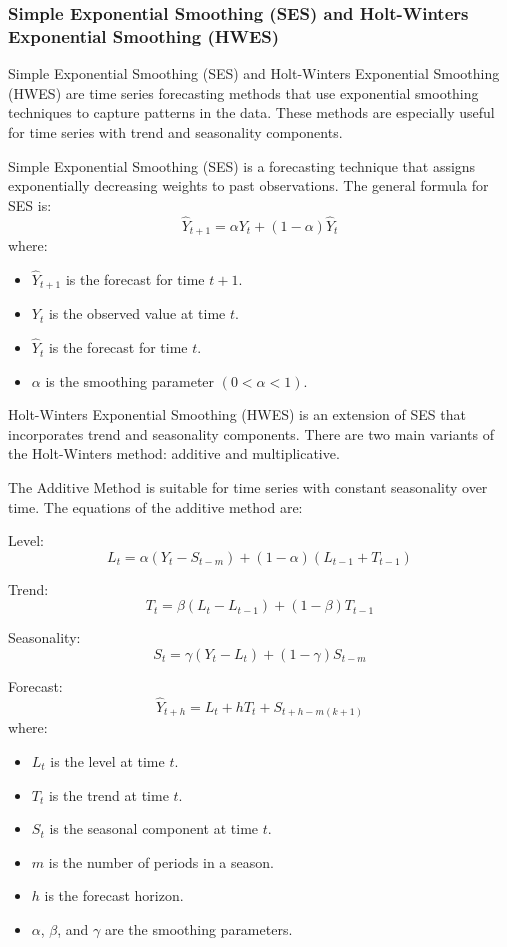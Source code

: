 \subsubsection{Simple Exponential Smoothing (SES) and Holt-Winters Exponential Smoothing (HWES)}

Simple Exponential Smoothing (SES) and Holt-Winters Exponential Smoothing (HWES) are time series forecasting methods that use exponential smoothing techniques to capture patterns in the data. These methods are especially useful for time series with trend and seasonality components.

Simple Exponential Smoothing (SES) is a forecasting technique that assigns exponentially decreasing weights to past observations. The general formula for SES is:
\[
\hat{Y}_{t+1} = \alpha Y_t + (1-\alpha) \hat{Y}_t
\]
where:
\begin{itemize}
    \item \( \hat{Y}_{t+1} \) is the forecast for time \( t+1 \).
    \item \( Y_t \) is the observed value at time \( t \).
    \item \( \hat{Y}_t \) is the forecast for time \( t \).
    \item \( \alpha \) is the smoothing parameter \( (0 < \alpha < 1) \).
\end{itemize}

Holt-Winters Exponential Smoothing (HWES) is an extension of SES that incorporates trend and seasonality components. There are two main variants of the Holt-Winters method: additive and multiplicative.

The Additive Method is suitable for time series with constant seasonality over time. The equations of the additive method are:

Level:
\[
L_t = \alpha (Y_t - S_{t-m}) + (1-\alpha)(L_{t-1} + T_{t-1})
\]

Trend:
\[
T_t = \beta (L_t - L_{t-1}) + (1-\beta) T_{t-1}
\]

Seasonality:
\[
S_t = \gamma (Y_t - L_t) + (1-\gamma) S_{t-m}
\]

Forecast:
\[
\hat{Y}_{t+h} = L_t + h T_t + S_{t+h-m(k+1)}
\]
where:
\begin{itemize}
    \item \( L_t \) is the level at time \( t \).
    \item \( T_t \) is the trend at time \( t \).
    \item \( S_t \) is the seasonal component at time \( t \).
    \item \( m \) is the number of periods in a season.
    \item \( h \) is the forecast horizon.
    \item \( \alpha \), \( \beta \), and \( \gamma \) are the smoothing parameters.
\end{itemize}

